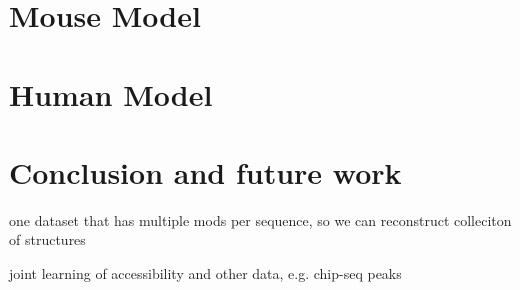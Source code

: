 \documentclass{proposal}
\begin{document}
\chapter{Mouse Model}


\chapter{Human Model}

\chapter{Conclusion and future work}

one dataset that has multiple mods per sequence, so we can reconstruct colleciton of structures

joint learning of accessibility and other data, e.g. chip-seq peaks




\end{document}
